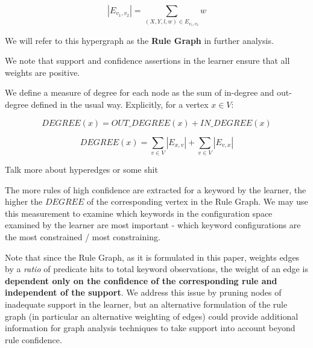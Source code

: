     $$|E_{v_1, v_2}| = \sum_{(X, Y, l, w) \in E_{v_1, v_2}} w$$

We will refer to this hypergraph as the {\bf Rule Graph}
in further analysis.

We note that support and confidence assertions in the learner ensure
that all weights are positive.

We define a measure of degree for each node as the sum of in-degree
and out-degree defined in the usual way. Explicitly, for a vertex $x \in V$:

    $$DEGREE(x) = OUT\_DEGREE(x) + IN\_DEGREE(x)$$

    $$DEGREE(x) = \sum_{v \in V} |E_{x, v}| + \sum_{v \in V} |E_{v, x}|$$

Talk more about hyperedges or some shit
\iffalse

Note that we will be summing in-degree and out-degree over all
relationships $l$ to determine the total importance of
a keyword $k$ in the configuration space. We are restricted
by the total set of learning modules from which to derive
relationships $l$. If a keyword were highly constrained by some
relationship to other keywords in a way that might not be
measurable by current techniques, the learner (and
consequently the rule graph) will show these keywords as being
unrelated.

\fi


The more rules of high confidence are extracted for a keyword by the learner, 
the higher the $DEGREE$ of the corresponding vertex in the Rule Graph.
We may use this measurement to examine which keywords in the configuration
space examined by the learner are most important - which keyword configurations
are the most constrained / most constraining.

Note that since the Rule Graph, as it is formulated in this paper, weights edges
by a {\it ratio} of predicate hits to total keyword observations, the weight
of an edge is {\bf dependent only on the confidence of the corresponding rule
and independent of the support}. We address this issue by pruning nodes of
inadequate support in the learner, but an alternative formulation of the rule
graph (in particular an alternative weighting of edges)
could provide additional
information for graph analysis techniques to take support into account
beyond rule confidence.


